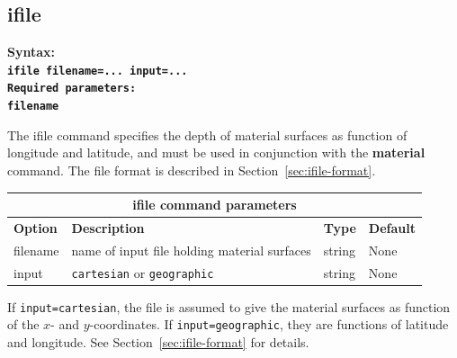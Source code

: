 \documentclass[11pt]{report}
\begin{document}
{\subsection{ifile}
\label{keyword:ifile}
\begin{flushleft}\bf
	Syntax:\\
	\tt ifile filename=... input=...\\
	\bf Required parameters:\\
	\tt filename
\end{flushleft}
The ifile command specifies the depth of material surfaces as function of longitude and latitude,
and must be used in conjunction with the {\bf material} command. The file format is
described in Section~\ref{sec:ifile-format}.
\begin{center}
	\begin{tabular}{|l|p{8cm}|l|l|} \hline
		\multicolumn{4}{|c|}{\bf ifile command parameters}                                    \\ \hline
		\bf{Option} & \bf{Description}                             & \bf{Type} & \bf{Default} \\ \hline \hline
		filename    & name of input file holding material surfaces & string    & None         \\ \hline
		input       & {\tt cartesian} or {\tt geographic}          & string    & None         \\ \hline
	\end{tabular}
\end{center}
If {\tt input=cartesian}, the file is assumed to give the material surfaces as function of the $x$-
and $y$-coordinates. If {\tt input=geographic}, they are functions of latitude and longitude. See
Section~\ref{sec:ifile-format} for details.

}
\end{document}
